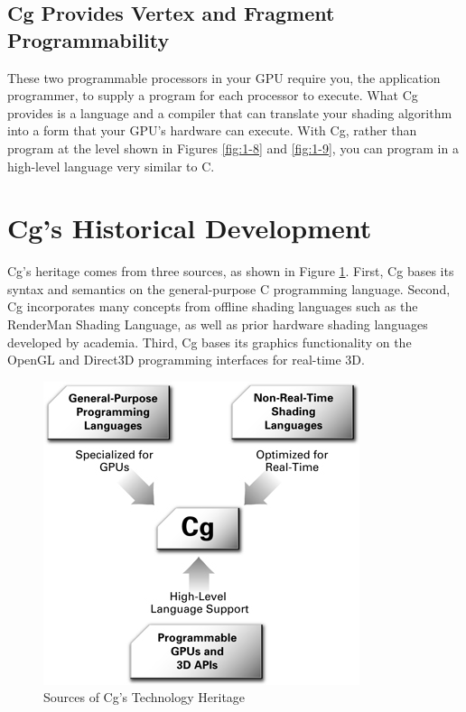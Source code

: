 \documentclass{book}
\begin{document}
\subsection{Cg Provides Vertex and Fragment Programmability}

These two programmable processors in your GPU require you, the application programmer, to supply a program for each processor to execute. What Cg provides is a language and a compiler that can translate your shading algorithm into a form that your GPU's hardware can execute. With Cg, rather than program at the level shown in Figures \ref{fig:1-8} and \ref{fig:1-9}, you can program in a high-level language very similar to C.

\section{Cg's Historical Development}

Cg's heritage comes from three sources, as shown in Figure \ref{fig:1-10}. First, Cg bases its syntax and semantics on the general-purpose C programming language. Second, Cg incorporates many concepts from offline shading languages such as the RenderMan Shading Language, as well as prior hardware shading languages developed by academia. Third, Cg bases its graphics functionality on the OpenGL and Direct3D programming interfaces for real-time 3D.

\begin{figure}
    \centering
    \includegraphics[width=1\linewidth]{Images/fig1_10.jpg}
    \caption{Sources of Cg's Technology Heritage}
    \label{fig:1-10}
\end{figure}
\end{document}

